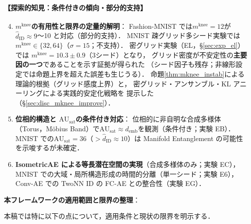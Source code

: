 \documentclass[11pt,a4paper]{jsarticle}
\newcommand{\AUsat}{\mathrm{AU}_{\mathrm{sat}}}
\newcommand{\mknee}{m^{\mathrm{knee}}}
\newcommand{\demb}{d_{\mathrm{emb}}}
\begin{document}
\paragraph{【探索的知見：条件付きの傾向・部分的支持】}
\begin{enumerate}
  \setcounter{enumi}{3}
  \item \textbf{$\mknee$の有用性と限界の定量的解明}：
        Fashion-MNIST では$\mknee = 12$が$\hat{d}_\mathrm{ID} \approx 9$〜10 と対応（部分的支持）．
        MNIST 疎グリッド多シード実験では$\mknee \in \{32, 64\}$（$\sigma=15$；不支持）．
        密グリッド実験（EL，§\ref{sec:exp_el}）では
        $\mknee = 10.3 \pm 0.9$（3シード）となり，
        グリッド密度が不安定性の\textbf{主要因の一つ}であることを示す証拠が得られた
        （シード因子も残存；非線形設定では命題上界を超えた誤差も生じうる）．
        命題\ref{thm:mknee_instab}による理論的根拠（グリッド感度上界）と，
        密グリッド・アンサンブル・KL アニーリングによる実践的安定化戦略を
        提示した（§\ref{sec:disc_mknee_improve}）．
  \item \textbf{位相的構造と $\AUsat$の条件付き対応}：
        位相的に非自明な合成多様体（Torus，Möbius Band）で$\AUsat \approx \demb$を観測（条件付き；実験 EB）．
        MNIST での$\AUsat = 36$（$> \hat{d}_\mathrm{ID} \approx 10$）は Manifold Entanglement の可能性を示唆するが未確定．
  \item \textbf{IsometricAE による等長潜在空間の実現}（合成多様体のみ；実験 EC），
        MNIST での大域・局所構造形成の時間的分離（単一シード；実験 E6），
        Conv-AE での TwoNN ID の FC-AE との整合性（実験 EG）．
\end{enumerate}

\textbf{本フレームワークの適用範囲と限界の整理}：

本稿では特に以下の点について，適用条件と現状の限界を明示する．
\end{document}
